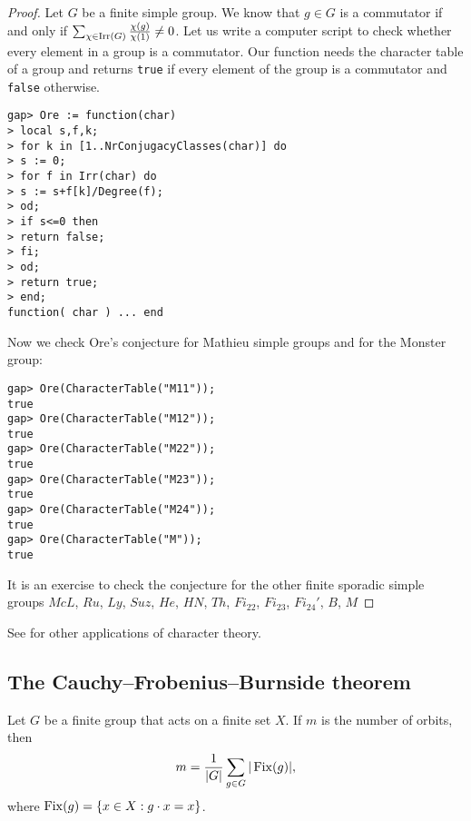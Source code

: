 \begin{proof}
    Let $G$ be a finite simple group. 
    We know that $g\in G$ is a commutator if and only if 
    $\sum_{\chi\in\operatorname{Irr}(G)}\frac{\chi(g)}{\chi(1)}\ne 0$. Let us write
    a computer script to check whether every element in a group 
    is a commutator. Our
    function needs the character table of a group and returns 
    \lstinline{true} if every element of the group is a commutator and
    \lstinline{false} otherwise. 
\begin{lstlisting}
gap> Ore := function(char) 
> local s,f,k;
> for k in [1..NrConjugacyClasses(char)] do
> s := 0;
> for f in Irr(char) do
> s := s+f[k]/Degree(f);  
> od;
> if s<=0 then
> return false;
> fi;
> od;
> return true;
> end;
function( char ) ... end
\end{lstlisting}
Now we check Ore's conjecture for Mathieu simple groups
and for the Monster group: 
\begin{lstlisting}
gap> Ore(CharacterTable("M11"));
true
gap> Ore(CharacterTable("M12"));
true
gap> Ore(CharacterTable("M22"));
true
gap> Ore(CharacterTable("M23"));
true
gap> Ore(CharacterTable("M24"));
true
gap> Ore(CharacterTable("M"));
true
\end{lstlisting}
It is an exercise to check the conjecture for the other finite sporadic 
simple groups $McL$, $Ru$, $Ly$, $Suz$, $He$, $HN$, $Th$, $Fi_{22}$, $Fi_{23}$, $Fi_{24}'$, $B$, $M$ 
\end{proof}

See \cite{MR3821142} for other applications of character theory. 

\subsection{The Cauchy--Frobenius--Burnside theorem}

\begin{theorem}
\label{thm:CFB}
    Let $G$ be a finite group that acts on a finite set $X$. 
    If $m$ is the number of orbits, then 
    \[
    m=\frac{1}{|G|}\sum_{g\in G}|\operatorname{Fix}(g)|,
    \]
    where $\operatorname{Fix}(g)=\{x\in X:g\cdot x=x\}$. 
\end{theorem}


